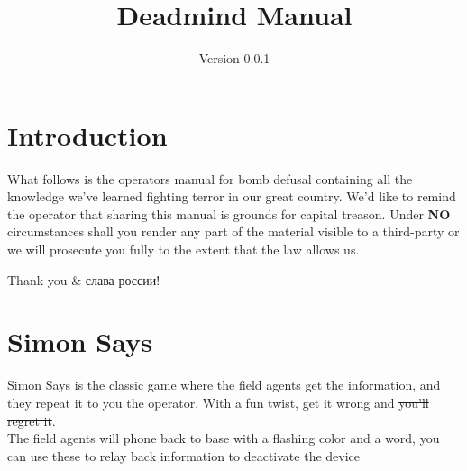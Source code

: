 \documentclass{article}
\title{Deadmind Manual}
\date{Version 0.0.1}
\begin{document}
\BgThispage

\maketitle

\section* {Introduction}
What follows is the operators manual for bomb defusal containing all the knowledge we've learned fighting terror in our great country. We'd like to remind the operator that sharing this manual is grounds for capital treason. Under \textbf{NO} circumstances shall you render any part of the material visible to a third-party or we will prosecute you fully to the extent that the law allows us.

Thank you \& слава россии!
\thispagestyle{empty}
\newpage
\BgThispage
\thispagestyle{empty}
\section* {Simon Says}

Simon Says is the classic game where the field agents get the information, and they repeat it to you the operator. With a fun twist, get it wrong and \st{you'll regret it}.\\

The field agents will phone back to base with a flashing color and a word, you can use these to relay back information to deactivate the device
\end{document}
